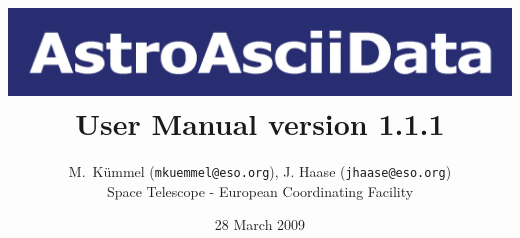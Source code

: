 \documentclass[]{article}
\newcommand{\AAD}{{\tt AstroAsciiData }}
\begin{document}
\title{
\centering
\includegraphics[width=.9\textwidth]{astroasciidata}
\newline
User Manual version 1.1.1}

\author{M.\ K\"ummel ({\tt mkuemmel@eso.org}),
J. Haase ({\tt jhaase@eso.org})\\
Space Telescope - European Coordinating Facility
}
\date{28 March 2009}
\maketitle

\tableofcontents










\end{document}
